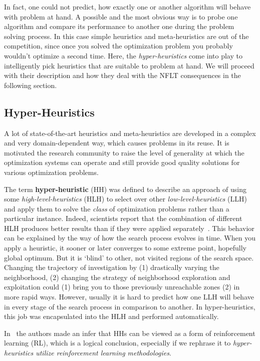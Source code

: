 In fact, one could not predict, how exactly one or another algorithm will behave with problem at hand. A possible and the most obvious way is to probe one algorithm and compare its performance to another one during the problem solving process. In this case simple heuristics and meta-heuristics are out of the competition, since once you solved the optimization problem you probably wouldn't optimize a second time.
Here, the \emph{hyper-heuristics} come into play to intelligently pick heuristics that are suitable to problem at hand. We will proceed with their description and how they deal with the NFLT consequences in the following section.


\subsection{Hyper-Heuristics}\label{bg: hh}
A lot of state-of-the-art heuristics and meta-heuristics are developed in a complex and very domain-dependent way, which causes problems in its reuse. It is motivated the research community to raise the level of generality at which the optimization systems can operate and still provide good quality solutions for various optimization problems. 

The term \textbf{hyper-heuristic} (HH) was defined to describe an approach of using some \textit{high-level-heuristics} (HLH) to select over other \textit{low-level-heuristics} (LLH) and apply them to solve the \textit{class} of optimization problems rather than a particular instance. Indeed, scientists report that the combination of different HLH produces better results than if they were applied separately~\cite{drake2019recent}.
This behavior can be explained by the way of how the search process evolves in time. When you apply a heuristic, it sooner or later converges to some extreme point, hopefully global optimum. But it is `blind' to other, not visited regions of the search space. Changing the trajectory of investigation by (1) drastically varying the neighborhood, (2) changing the strategy of neighborhood exploration and exploitation could (1) bring you to those previously unreachable zones (2) in more rapid ways. However, usually it is hard to predict how one LLH will behave in every stage of the search process in comparison to another. In hyper-heuristics, this job was encapsulated into the HLH and performed automatically. 

In~\cite{moriarty1999evolutionary} the authors made an infer that HHs can be viewed as a form of reinforcement learning (RL), which is a logical conclusion, especially if we rephrase it to \textit{hyper-heuristics utilize reinforcement learning methodologies}.

